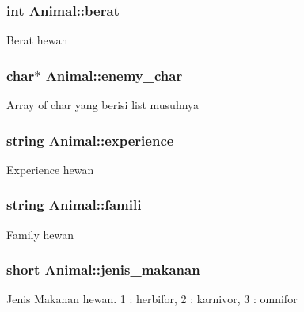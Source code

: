 \subsubsection[{\texorpdfstring{berat}{berat}}]{\setlength{\rightskip}{0pt plus 5cm}int Animal\+::berat\hspace{0.3cm}{\ttfamily [protected]}}\hypertarget{class_animal_ad122855148e51ecfe706d099bb0eb6ac}{}\label{class_animal_ad122855148e51ecfe706d099bb0eb6ac}
Berat hewan 
\subsubsection[{\texorpdfstring{enemy\+\_\+char}{enemy_char}}]{\setlength{\rightskip}{0pt plus 5cm}char$\ast$ Animal\+::enemy\+\_\+char\hspace{0.3cm}{\ttfamily [protected]}}\hypertarget{class_animal_ae219f1b898b5e6afed1ecad4375b8124}{}\label{class_animal_ae219f1b898b5e6afed1ecad4375b8124}
Array of char yang berisi list musuhnya 
\subsubsection[{\texorpdfstring{experience}{experience}}]{\setlength{\rightskip}{0pt plus 5cm}string Animal\+::experience\hspace{0.3cm}{\ttfamily [protected]}}\hypertarget{class_animal_a015f8fc08cd5e454b61d597805fa6e54}{}\label{class_animal_a015f8fc08cd5e454b61d597805fa6e54}
Experience hewan 
\subsubsection[{\texorpdfstring{famili}{famili}}]{\setlength{\rightskip}{0pt plus 5cm}string Animal\+::famili\hspace{0.3cm}{\ttfamily [protected]}}\hypertarget{class_animal_aab17c94dd15ad3224c3c05ac74367be9}{}\label{class_animal_aab17c94dd15ad3224c3c05ac74367be9}
Family hewan 
\subsubsection[{\texorpdfstring{jenis\+\_\+makanan}{jenis_makanan}}]{\setlength{\rightskip}{0pt plus 5cm}short Animal\+::jenis\+\_\+makanan\hspace{0.3cm}{\ttfamily [protected]}}\hypertarget{class_animal_a703d6acefaa69242f9665c81f3e91c21}{}\label{class_animal_a703d6acefaa69242f9665c81f3e91c21}
Jenis Makanan hewan. 1 \+: herbifor, 2 \+: karnivor, 3 \+: omnifor 
